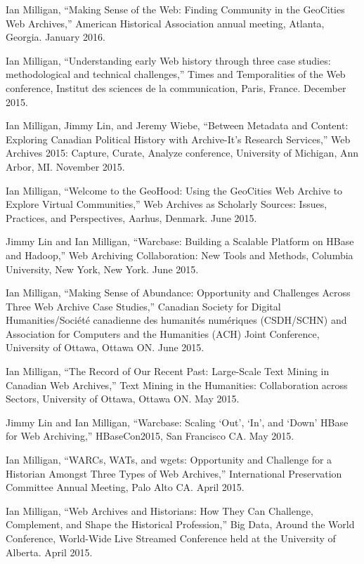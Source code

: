 \documentclass[11pt,article,oneside]{memoir}
\begin{document}
\ind Ian Milligan, ``Making Sense of the Web: Finding Community in the GeoCities Web Archives,'' American Historical Association annual meeting, Atlanta, Georgia. January 2016. 

\ind Ian Milligan, ``Understanding early Web history through three case studies: methodological and technical challenges,'' Times and Temporalities of the Web conference, Institut des sciences de la communication, Paris, France. December 2015. 

\ind Ian Milligan, Jimmy Lin, and Jeremy Wiebe, ``Between Metadata and Content: Exploring Canadian Political History with Archive-It's Research Services,'' Web Archives 2015: Capture, Curate, Analyze conference, University of Michigan, Ann Arbor, MI. November 2015. 

\ind Ian Milligan, ``Welcome to the GeoHood: Using the GeoCities Web Archive to Explore Virtual Communities,'' Web Archives as Scholarly Sources: Issues, Practices, and Perspectives, Aarhus, Denmark. June 2015. 

\ind Jimmy Lin and Ian Milligan, ``Warcbase: Building a Scalable Platform on HBase and Hadoop,'' Web Archiving Collaboration: New Tools and Methods, Columbia University, New York, New York. June 2015. 

\ind Ian Milligan, ``Making Sense of Abundance: Opportunity and Challenges Across Three Web Archive Case Studies,'' Canadian Society for Digital Humanities/Soci\'et\'e canadienne des humanit\'es num\'eriques (CSDH/SCHN) and Association for Computers and the Humanities (ACH) Joint Conference, University of Ottawa, Ottawa ON. June 2015. 

\ind Ian Milligan, ``The Record of Our Recent Past: Large-Scale Text Mining in Canadian Web Archives,'' Text Mining in the Humanities: Collaboration across Sectors, University of Ottawa, Ottawa ON. May 2015. 

\ind Jimmy Lin and Ian Milligan, ``Warcbase: Scaling `Out', `In', and `Down' HBase for Web Archiving,'' HBaseCon2015, San Francisco CA. May 2015. 

\ind Ian Milligan, ``WARCs, WATs, and wgets: Opportunity and Challenge for a Historian Amongst Three Types of Web Archives,'' International Preservation Committee Annual Meeting, Palo Alto CA. April 2015. 

\ind Ian Milligan, ``Web Archives and Historians: How They Can Challenge, Complement, and Shape the Historical Profession,'' Big Data, Around the World Conference, World-Wide Live Streamed Conference held at the University of Alberta. April 2015. 
\end{document}
